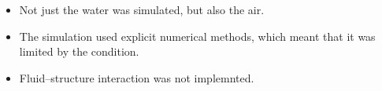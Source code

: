 \begin{itemize}
\end{itemize}

\HRule

\begin{itemize}
    \item Not just the water was simulated, but also the air. %
    
    \item The simulation used explicit numerical methods, which meant that it was limited by the \CFL condition. %
    
    \item Fluid--structure interaction was not implemnted. %
\end{itemize}